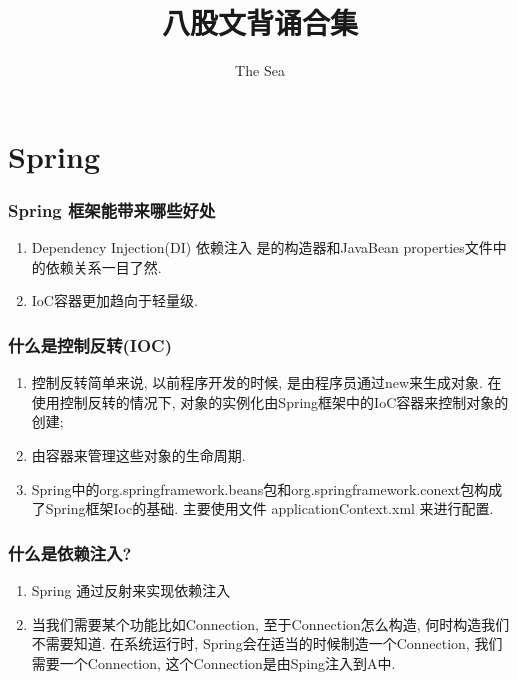 \documentclass[UTF8]{ctexart}
\begin{document}
	
	\title{八股文背诵合集}
	\author{The Sea}
	\maketitle
	
	\tableofcontents
	\newpage
	
	\section{Spring}
	\subsubsection{Spring 框架能带来哪些好处}

	\begin{enumerate}
		\item Dependency Injection(DI) 依赖注入 是的构造器和JavaBean properties文件中的依赖关系一目了然.
		\item IoC容器更加趋向于轻量级.
	\end{enumerate}
	
	\subsubsection{什么是控制反转(IOC)}
	\begin{enumerate}
		\item 
		控制反转简单来说, 以前程序开发的时候, 是由程序员通过new来生成对象. 在使用控制反转的情况下, 对象的实例化由Spring框架中的IoC容器来控制对象的创建; 
		\item 由容器来管理这些对象的生命周期.
		\item Spring中的org.springframework.beans包和org.springframework.conext包构成了Spring框架Ioc的基础. 主要使用文件 applicationContext.xml 来进行配置.
	\end{enumerate}

	\subsubsection{什么是依赖注入?}
	\begin{enumerate}
		\item Spring 通过反射来实现依赖注入
		\item 当我们需要某个功能比如Connection, 至于Connection怎么构造, 何时构造我们不需要知道. 在系统运行时, Spring会在适当的时候制造一个Connection, 我们需要一个Connection, 这个Connection是由Sping注入到A中. 
	\end{enumerate}
	
\end{document}
